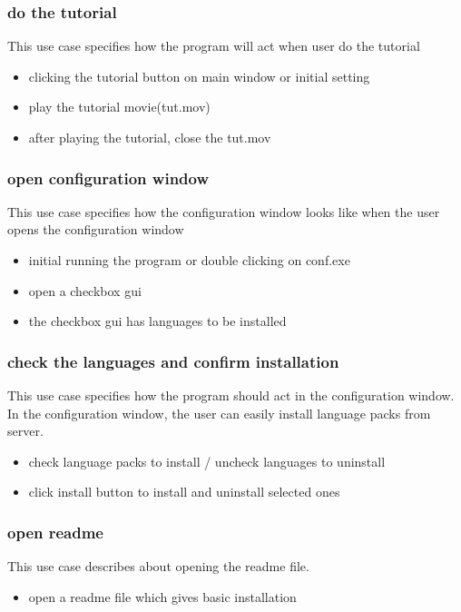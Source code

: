 \documentclass[conference]{IEEEtran}
\begin{document}
\subsubsection{do the tutorial}
This use case specifies how the program will act when user do the tutorial
\begin{itemize}
  \item clicking the tutorial button on main window or initial setting 
  \item play the tutorial movie(tut.mov)
  \item after playing the tutorial, close the tut.mov
\end{itemize}
\textit{}



\subsubsection{open configuration window}
This use case specifies how the configuration window looks like when the user opens the configuration window
\begin{itemize}
  \item initial running the program or double clicking on conf.exe
  \item open a checkbox gui
  \item the checkbox gui has languages to be installed
\end{itemize}
\textit{}



\subsubsection{check the languages and confirm installation}
This use case specifies how the program should act in the configuration window. In the configuration window, the user can easily install language packs from server.
\begin{itemize}
  \item check language packs to install / uncheck languages to uninstall
  \item click install button to install and uninstall selected ones
\end{itemize}
\textit{}



\subsubsection{open readme}
This use case describes about opening the readme file.
\begin{itemize}
  \item open a readme file which gives basic installation
\end{itemize}
\textit{}
\end{document}
